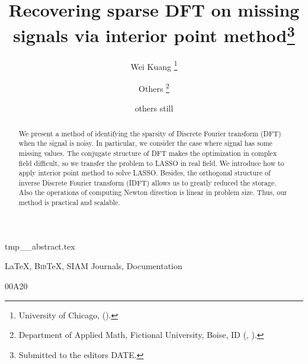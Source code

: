 \documentclass[final,onefignum,onetabnum]{siamart190516}
\title{Recovering sparse DFT on missing signals via interior point method\thanks{Submitted to the editors DATE.
\funding{Funding information goes here.}}}
\author{Wei Kuang \thanks{University of Chicago, (\email{ddoe@imag.com}).}
\and Others \thanks{Department of Applied Math, Fictional University, Boise, ID (\email{ptfrank@fictional.edu}, \email{jesmith@fictional.edu}).}
\and others still \footnotemark[3]}
\newcommand{\BibTeX}{{\scshape Bib}\TeX\xspace}
\begin{document}
\maketitle

\begin{tcbverbatimwrite}{tmp_\jobname_abstract.tex}
\begin{abstract}
We present a method of identifying the sparsity of Discrete Fourier transform (DFT) when the signal is noisy. In particular, we consider the case where signal has some missing values. The conjugate structure of DFT makes the optimization in complex field difficult, so we transfer the problem to LASSO in real field. We introduce how to apply interior point method to solve LASSO. Besides, the orthogonal structure of inverse Discrete Fourier transform (IDFT) allows us to greatly reduced the storage. Also the operations of computing Newton direction is linear in problem size. Thus, our method is practical and scalable. 
\end{abstract}

\begin{keywords}
  \LaTeX, \BibTeX, SIAM Journals, Documentation 
\end{keywords}

\begin{AMS}
  00A20 
\end{AMS}
\end{tcbverbatimwrite}

\end{document}
